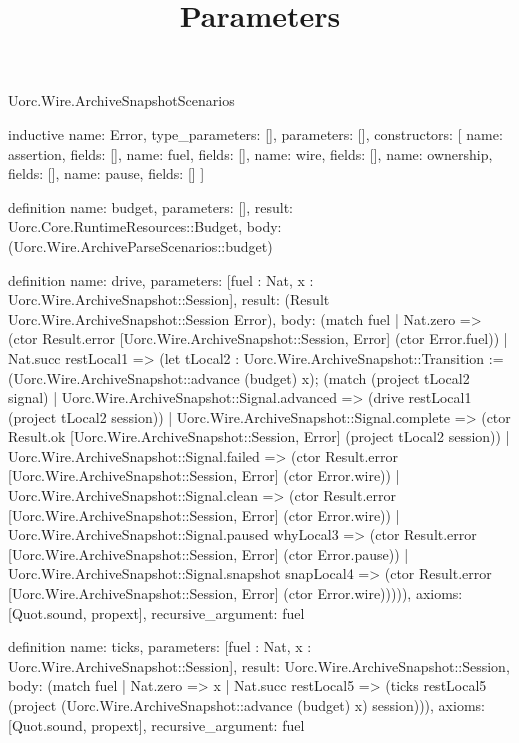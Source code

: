 \begin{lexlean}{Uorc.Wire.ArchiveSnapshotScenarios}
\title{Parameters}
\begin{semanticmodule}
inductive{
  name: Error,
  type_parameters: [],
  parameters: [],
  constructors: [
    {name: assertion, fields: []},
    {name: fuel, fields: []},
    {name: wire, fields: []},
    {name: ownership, fields: []},
    {name: pause, fields: []}
  ]
}

definition{
  name: budget,
  parameters: [],
  result: Uorc.Core.RuntimeResources::Budget,
  body: (Uorc.Wire.ArchiveParseScenarios::budget)
}

definition{
  name: drive,
  parameters: [fuel : Nat, x : Uorc.Wire.ArchiveSnapshot::Session],
  result: (Result Uorc.Wire.ArchiveSnapshot::Session Error),
  body: (match fuel
    | Nat.zero => (ctor Result.error [Uorc.Wire.ArchiveSnapshot::Session, Error] (ctor Error.fuel))
    | Nat.succ restLocal1 => (let tLocal2 : Uorc.Wire.ArchiveSnapshot::Transition := (Uorc.Wire.ArchiveSnapshot::advance (budget) x); (match (project tLocal2 signal)
      | Uorc.Wire.ArchiveSnapshot::Signal.advanced => (drive restLocal1 (project tLocal2 session))
      | Uorc.Wire.ArchiveSnapshot::Signal.complete => (ctor Result.ok [Uorc.Wire.ArchiveSnapshot::Session, Error] (project tLocal2 session))
      | Uorc.Wire.ArchiveSnapshot::Signal.failed => (ctor Result.error [Uorc.Wire.ArchiveSnapshot::Session, Error] (ctor Error.wire))
      | Uorc.Wire.ArchiveSnapshot::Signal.clean => (ctor Result.error [Uorc.Wire.ArchiveSnapshot::Session, Error] (ctor Error.wire))
      | Uorc.Wire.ArchiveSnapshot::Signal.paused whyLocal3 => (ctor Result.error [Uorc.Wire.ArchiveSnapshot::Session, Error] (ctor Error.pause))
      | Uorc.Wire.ArchiveSnapshot::Signal.snapshot snapLocal4 => (ctor Result.error [Uorc.Wire.ArchiveSnapshot::Session, Error] (ctor Error.wire))))),
  axioms: [Quot.sound, propext],
  recursive_argument: fuel
}

definition{
  name: ticks,
  parameters: [fuel : Nat, x : Uorc.Wire.ArchiveSnapshot::Session],
  result: Uorc.Wire.ArchiveSnapshot::Session,
  body: (match fuel
    | Nat.zero => x
    | Nat.succ restLocal5 => (ticks restLocal5 (project (Uorc.Wire.ArchiveSnapshot::advance (budget) x) session))),
  axioms: [Quot.sound, propext],
  recursive_argument: fuel
}


\end{semanticmodule}
\end{lexlean}
